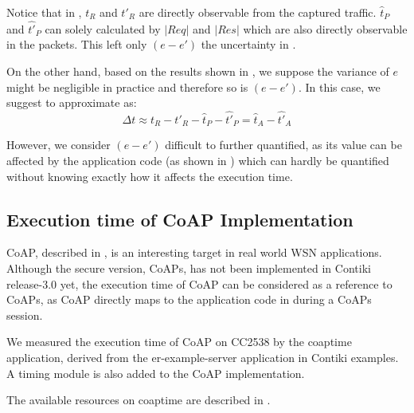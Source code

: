 Notice that in , $t_R$ and $t'_R$ are directly observable from the captured traffic. $\hat{t}_P$ and $\hat{t'}_P$ can solely calculated by $|Req|$ and $|Res|$ which are also directly observable in the packets. This left only $(e-e')$ the uncertainty in .

On the other hand,  based on the results shown in , we suppose  the variance of $e$ might be negligible in practice and therefore so is $(e - e')$. In this case, we suggest to approximate  as:
\begin{equation}
	\Delta t \approx t_R - t'_R - \hat{t}_P - \hat{t'}_P = \hat{t}_A - \hat{t'}_A
\end{equation}

However, we consider $(e - e')$ difficult to further quantified, as its value can be affected by the application code (as shown in  ) which can hardly be quantified without knowing exactly how it affects the execution time.

\subsection{Execution time of CoAP Implementation}

CoAP, described in , is an interesting target in real world WSN applications. Although the secure version, CoAPs, has not been implemented in Contiki release-3.0 yet, the execution time of CoAP can be considered as a reference to CoAPs, as CoAP directly maps to the application code in  during a CoAPs session.

We measured the execution time of CoAP on CC2538 by the coaptime application,  derived from the er-example-server application in Contiki examples. A timing module is also added to the CoAP implementation. 

The available resources on coaptime are described in .

